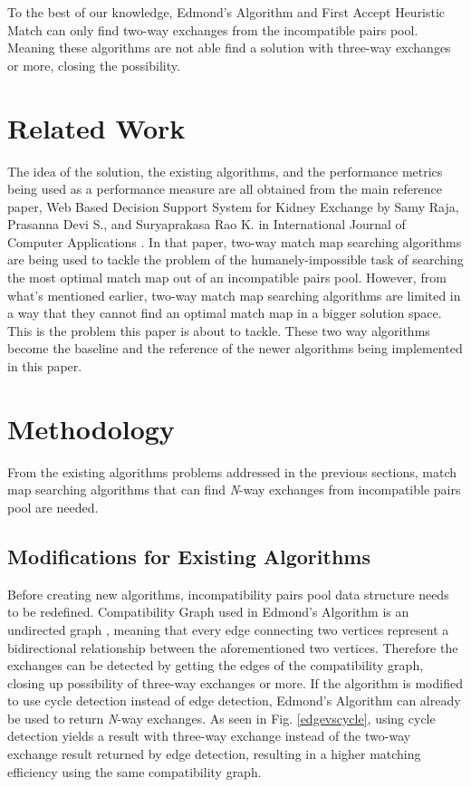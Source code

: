 \documentclass[conference]{IEEEtran}
\begin{document}
To the best of our knowledge, Edmond's Algorithm and First Accept Heuristic Match can only find two-way exchanges from the
incompatible pairs pool. Meaning these algorithms are not able find a solution with three-way exchanges or more,
closing the possibility.

\section{Related Work}
The idea of the solution, the existing algorithms, and the performance metrics being used as a performance measure are
all obtained from the main reference paper, Web Based Decision Support System for Kidney Exchange by Samy Raja, Prasanna
Devi S., and Suryaprakasa Rao K. in International Journal of Computer Applications \cite{raja}. In that paper, two-way
match map searching algorithms are being used to tackle the problem of the humanely-impossible task of searching the most
optimal match map out of an incompatible pairs pool. However, from what's mentioned earlier, two-way match map searching
algorithms are limited in a way that they cannot find an optimal match map in a bigger solution space. This is the problem
this paper is about to tackle. These two way algorithms become the baseline and the reference of the newer algorithms
being implemented in this paper.

\section{Methodology}
From the existing algorithms problems addressed in the previous sections, match map searching algorithms that can find
\textit{N}-way exchanges from incompatible pairs pool are needed.

\subsection{Modifications for Existing Algorithms}
Before creating new algorithms, incompatibility pairs pool data structure needs to be redefined. Compatibility Graph
used in Edmond's Algorithm is an undirected graph \cite{raja}, meaning that every edge connecting two vertices represent a bidirectional
relationship between the aforementioned two vertices. Therefore the exchanges can be detected by getting the edges of the
compatibility graph, closing up possibility of three-way exchanges or more. If the algorithm is modified to use cycle detection
instead of edge detection, Edmond's Algorithm can already be used to return \textit{N}-way exchanges.
As seen in Fig. \ref{edgevscycle}, using cycle detection yields a result with three-way exchange instead of the two-way exchange result
returned by edge detection, resulting in a higher matching efficiency using the same compatibility graph. 
\end{document}
